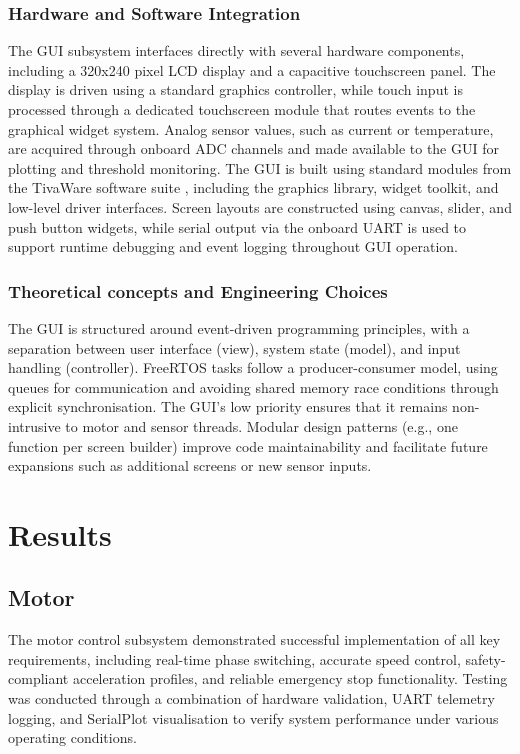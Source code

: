 \documentclass[a4paper, 11pt, titlepage]{article}
\begin{document}
\subsubsection{Hardware and Software Integration}
The GUI subsystem interfaces directly with several hardware components, including a 320x240 pixel LCD display and a capacitive touchscreen panel. The display is driven using a standard graphics controller, while touch input is processed through a dedicated touchscreen module that routes events to the graphical widget system. Analog sensor values, such as current or temperature, are acquired through onboard ADC channels and made available to the GUI for plotting and threshold monitoring. The GUI is built using standard modules from the TivaWare software suite \parencite{grlib}, including the graphics library, widget toolkit, and low-level driver interfaces. Screen layouts are constructed using canvas, slider, and push button widgets, while serial output via the onboard UART is used to support runtime debugging and event logging throughout GUI operation.\\

\subsubsection{Theoretical concepts and Engineering Choices}
The GUI is structured around event-driven programming principles, with a separation between user interface (view), system state (model), and input handling (controller). FreeRTOS tasks follow a producer-consumer model, using queues for communication and avoiding shared memory race conditions through explicit synchronisation. The GUI’s low priority ensures that it remains non-intrusive to motor and sensor threads. Modular design patterns (e.g., one function per screen builder) improve code maintainability and facilitate future expansions such as additional screens or new sensor inputs.


 
\newpage
\section{Results}
\subsection{Motor}
The motor control subsystem demonstrated successful implementation of all key requirements, including real-time phase switching, accurate speed control, safety-compliant acceleration profiles, and reliable emergency stop functionality. Testing was conducted through a combination of hardware validation, UART telemetry logging, and SerialPlot \parencite{serialplot} visualisation to verify system performance under various operating conditions.
\end{document}
